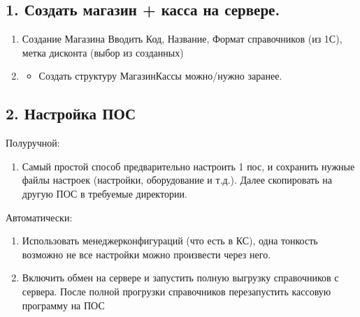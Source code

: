 \documentclass[letterpaper,10pt,russian]{sphinxmanual}
\begin{document}
\subsection{1. Создать магазин + касса на сервере.}
\label{\detokenize{kass:id2}}\begin{enumerate}
%
\item {} 
\sphinxAtStartPar
Создание Магазина \sphinxhyphen{} Вводить Код, Название, Формат справочников (из 1С), метка дисконта (выбор из созданных)

\item {} \begin{description}
\begin{itemize}
\item {} 
\sphinxAtStartPar
Создать структуру Магазин\sphinxhyphen{}Кассы можно/нужно заранее.

\end{itemize}

\end{description}

\end{enumerate}


\subsection{2. Настройка ПОС}
\label{\detokenize{kass:id3}}
\sphinxAtStartPar
Полуручной:
\begin{enumerate}
%
\item {} 
\sphinxAtStartPar
Самый простой способ предварительно настроить 1 пос, и сохранить нужные файлы настроек (настройки, оборудование и т.д.). Далее скопировать на другую ПОС в требуемые директории.

\end{enumerate}

\sphinxAtStartPar
Автоматически:
\begin{enumerate}
%
\item {} 
\sphinxAtStartPar
Использовать менеджер\sphinxhyphen{}конфигураций (что есть в КС), одна тонкость \sphinxhyphen{} возможно не все настройки можно произвести через него.

\item {} 
\sphinxAtStartPar
Включить обмен на сервере и запустить полную выгрузку справочников с сервера. После полной прогрузки справочников \sphinxhyphen{} перезапустить кассовую программу на ПОС

\end{enumerate}
\end{document}
